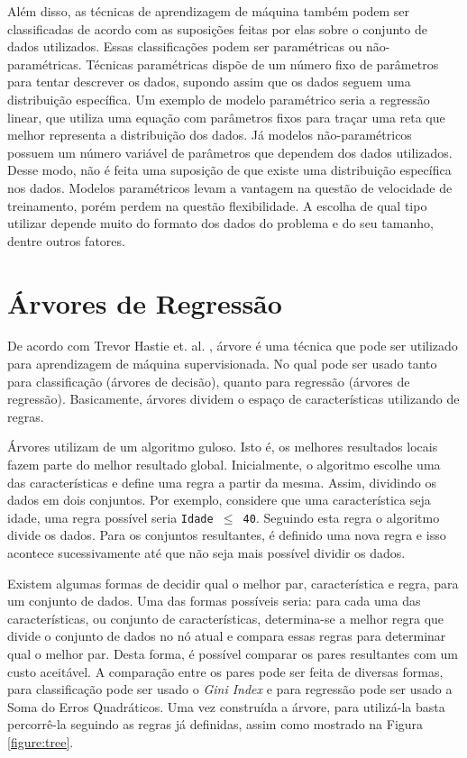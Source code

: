 Além disso, as técnicas de aprendizagem de máquina também podem ser classificadas de acordo com as suposições feitas por elas sobre o conjunto de dados utilizados. Essas classificações podem ser paramétricas ou não-paramétricas. Técnicas paramétricas dispõe de um número fixo de parâmetros para tentar descrever os dados, supondo assim que os dados seguem uma distribuição específica. Um exemplo de modelo paramétrico seria a regressão linear, que utiliza uma equação com parâmetros fixos para traçar uma reta que melhor representa a distribuição dos dados. Já modelos não-paramétricos possuem um número variável de parâmetros que dependem dos dados utilizados. Desse modo, não é feita uma suposição de que existe uma distribuição específica nos dados. Modelos paramétricos levam a vantagem na questão de velocidade de treinamento, porém perdem na questão flexibilidade. A escolha de qual tipo utilizar depende muito do formato dos dados do problema e do seu tamanho, dentre outros fatores.

\section{Árvores de Regressão}

De acordo com Trevor Hastie et. al. \cite{hastie2005elements}, árvore é uma técnica que pode ser utilizado para aprendizagem de máquina supervisionada. No qual pode ser usado tanto para classificação (árvores de decisão), quanto para regressão (árvores de regressão). Basicamente, árvores dividem o espaço de características utilizando de regras.

Árvores utilizam de um algoritmo guloso. Isto é, os melhores resultados locais fazem parte do melhor resultado global. Inicialmente, o algoritmo escolhe uma das características e define uma regra a partir da mesma. Assim, dividindo os dados em dois conjuntos. Por exemplo, considere que uma característica seja idade, uma regra possível seria \texttt{Idade \(\leq\) 40}. Seguindo esta regra o algoritmo divide os dados. Para os conjuntos resultantes, é definido uma nova regra e isso acontece sucessivamente até que não seja mais possível dividir os dados.

Existem algumas formas de decidir qual o melhor par, característica e regra, para um conjunto de dados. Uma das formas possíveis seria: para cada uma das características, ou conjunto de características, determina-se a melhor regra que divide o conjunto de dados no nó atual e compara essas regras para determinar qual o melhor par. Desta forma, é possível comparar os pares resultantes com um custo aceitável. A comparação entre os pares pode ser feita de diversas formas, para classificação pode ser usado o \textit{Gini Index} e para regressão pode ser usado a Soma do Erros Quadráticos. Uma vez construída a árvore, para utilizá-la basta percorrê-la seguindo as regras já definidas, assim como mostrado na Figura \ref{figure:tree}.

